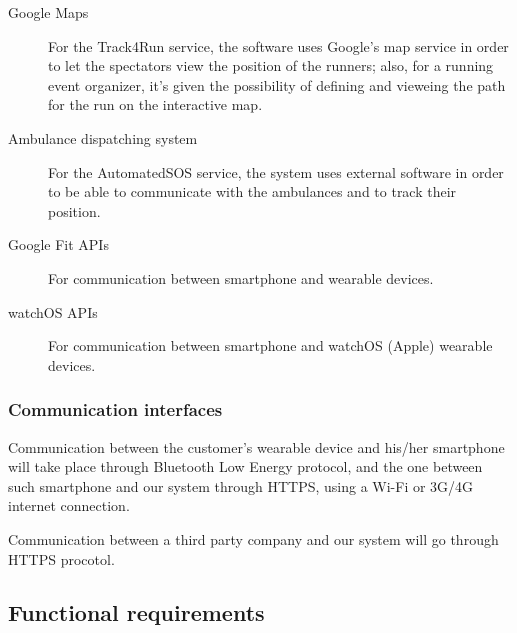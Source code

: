 \documentclass[../main.tex]{subfiles}
\begin{document}
\begin{description}

	\item [Google Maps] For the Track4Run service, the software uses Google's map service in order to let the spectators view the position of the runners; also, for a running event organizer, it's given the possibility of defining and vieweing the path for the run on the interactive map.

	\item [Ambulance dispatching system] For the AutomatedSOS service, the system uses external software in order to be able to communicate with the ambulances and to track their position.

	\item [Google Fit APIs] For communication between smartphone and wearable devices.
	\item [watchOS APIs] For communication between smartphone and watchOS (Apple) wearable devices.
\end{description}


\subsubsection{Communication interfaces}

Communication between the customer's wearable device and his/her smartphone will take place through Bluetooth Low Energy protocol, and the one between such smartphone and our system through HTTPS, using a Wi-Fi or 3G/4G internet connection.

Communication between a third party company and our system will go through HTTPS procotol.


\subsection{Functional requirements}
\end{document}
